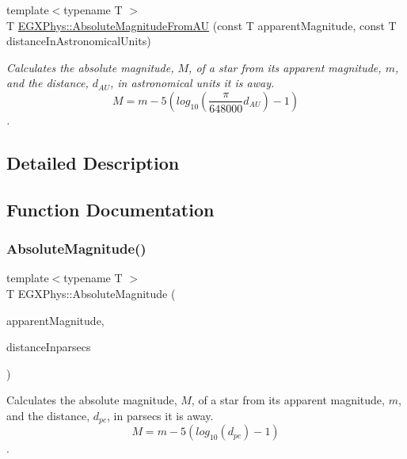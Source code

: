 \begin{DoxyCompactItemize}
{\footnotesize template$<$typename T $>$ }\\T \mbox{\hyperlink{group___e_g_x_phys-_astrophysics-_absolute_magnitude_gab25029a422f98bc7f8cea59abce3860e}{E\+G\+X\+Phys\+::\+Absolute\+Magnitude\+From\+AU}} (const T apparent\+Magnitude, const T distance\+In\+Astronomical\+Units)
\begin{DoxyCompactList}\small\item\em Calculates the absolute magnitude, $M$, of a star from its apparent magnitude, $m$, and the distance, $d_{AU}$, in astronomical units it is away. \[M= m - 5 \left ( log_{10} \left ( \dfrac{\pi}{648000}d_{AU} \right ) - 1 \right )\]. \end{DoxyCompactList}\end{DoxyCompactItemize}


\subsection{Detailed Description}


\subsection{Function Documentation}
\mbox{\label{group___e_g_x_phys-_astrophysics-_absolute_magnitude_ga2ddb255fa28972334d82f377ce182048}} 
\subsubsection{\texorpdfstring{Absolute\+Magnitude()}{AbsoluteMagnitude()}}
{\footnotesize\ttfamily template$<$typename T $>$ \\
T E\+G\+X\+Phys\+::\+Absolute\+Magnitude (\begin{DoxyParamCaption}\item[{const T}]{apparent\+Magnitude,  }\item[{const T}]{distance\+Inparsecs }\end{DoxyParamCaption})}



Calculates the absolute magnitude, $M$, of a star from its apparent magnitude, $m$, and the distance, $d_{pc}$, in parsecs it is away. \[M= m - 5 \left ( log_{10}(d_{pc}) - 1 \right )\]. 

